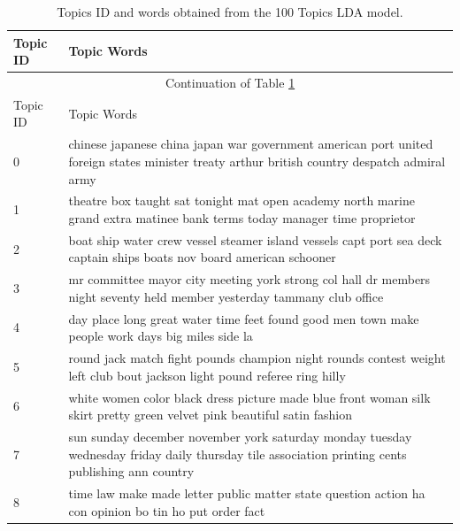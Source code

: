 \documentclass[letterpaper,11pt]{report}
\begin{document}
  \newpage
 \begin{longtable}[c]{| p{1cm} | p{16cm} |}
 \caption{Topics ID and words obtained from the 100 Topics LDA model.\label{long}}\\
\hline
 Topic ID & Topic Words\\
 \hline
 \endfirsthead
 
 \hline
 \multicolumn{2}{|c|}{Continuation of Table \ref{long}}\\
 \hline
 Topic ID & Topic Words\\
 \hline
 \endhead
 
 \hline
 \endfoot
 

0  & chinese japanese china japan war government american port united foreign states minister treaty arthur british country despatch admiral army                     \\ \hline
1  & theatre box taught sat tonight mat open academy north marine grand extra matinee bank terms today manager time proprietor                                        \\ \hline
2  & boat ship water crew vessel steamer island vessels capt port sea deck captain ships boats nov board american schooner                                            \\ \hline
3  & mr committee mayor city meeting york strong col hall dr members night seventy held member yesterday tammany club office                                          \\ \hline
4  & day place long great water time feet found good men town make people work days big miles side la                                                                 \\ \hline
5  & round jack match fight pounds champion night rounds contest weight left club bout jackson light pound referee ring hilly                                         \\ \hline
6  & white women color black dress picture made blue front woman silk skirt pretty green velvet pink beautiful satin fashion                                          \\ \hline
7  & sun sunday december november york saturday monday tuesday wednesday friday daily thursday tile association printing cents publishing ann country                 \\ \hline
8  & time law make made letter public matter state question action ha con opinion bo tin ho put order fact                                                            \\ \hline

\end{longtable}
\end{document}
